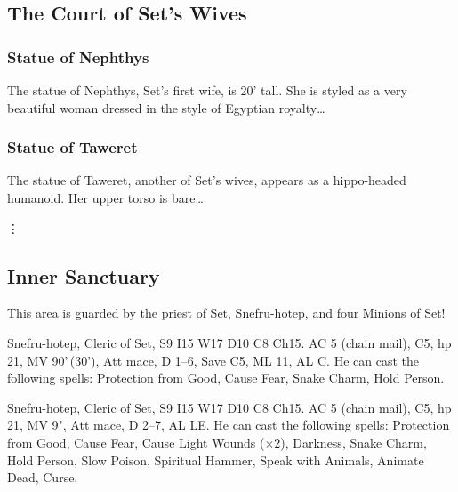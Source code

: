 \documentclass[letterpaper,serif]{rpg-module}
\begin{document}
\lipsum[7-8]

\subsection{The Court of Set's Wives} %

\lipsum[9]

\subsubsection{Statue of Nephthys} %
\label{west_court}

The statue of Nephthys, Set's first wife, is 20' tall. She is styled as a very beautiful woman dressed in the
style of Egyptian royalty\ldots

\subsubsection{Statue of Taweret} %

The statue of Taweret, another of Set's wives, appears as a hippo-headed humanoid. Her upper torso is bare\ldots

\vdots

\setcounter{subsection}{13} %

\subsection{Inner Sanctuary} %
\label{inner_sanctuary}

This area is guarded by the priest of Set, Snefru-hotep, and four Minions of Set!
\begin{statblockfreestyle}
\begin{ifbasicstats}
Snefru-hotep, Cleric of Set, S9 I15 W17 D10 C8 Ch15. AC 5 (chain mail), C5, hp 21, MV 90'\,(30'), Att mace, D 1--6, Save C5, ML 11, AL C.
He can cast the following spells: Protection from Good, Cause Fear, Snake Charm, Hold Person.
\end{ifbasicstats}
\begin{ifadvancedstats}
Snefru-hotep, Cleric of Set, S9 I15 W17 D10 C8 Ch15. AC 5 (chain mail), C5, hp 21, MV 9", Att mace, D 2--7, AL LE.
He can cast the following spells: Protection from Good, Cause Fear, Cause Light Wounds ($\times 2$), Darkness,
Snake Charm, Hold Person, Slow Poison, Spiritual Hammer, Speak with Animals, Animate Dead, Curse.
\end{ifadvancedstats}
\end{statblockfreestyle}
\lipsum[10-11]
\end{document}
